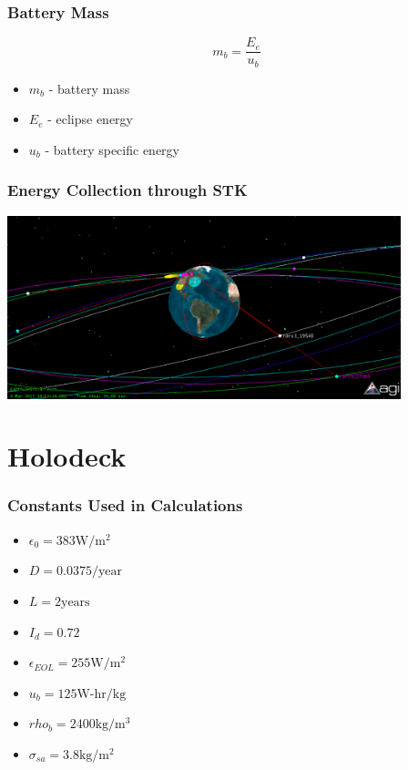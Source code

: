 \documentclass{beamer}
\begin{document}
\begin{frame}
  \frametitle{Battery Mass}
  \[m_b = \frac{E_e}{u_b}\]

  \begin{itemize}
  \item $m_b$ - battery mass
  \item $E_e$ - eclipse energy
  \item $u_b$ - battery specific energy
  \end{itemize}
\end{frame}

\begin{frame}
  \frametitle{Energy Collection through STK}
  \begin{center}
    \includegraphics[width=4.5in]{img/stk}
  \end{center}
\end{frame}

\section{Holodeck}
\begin{frame}
  \frametitle{Constants Used in Calculations}
  \begin{itemize}
  \item $\epsilon_0 = 383 \text{W}/\text{m}^2$
  \item $D = 0.0375/\text{year}$
  \item $L = 2 \text{years}$
  \item $I_d = 0.72$
  \item $\epsilon_{EOL} = 255 \text{W}/\text{m}^2$
  \item $u_b = 125 \text{W-hr}/\text{kg}$
  \item $rho_b = 2400 \text{kg}/\text{m}^3$
  \item $\sigma_{sa} = 3.8 \text{kg}/\text{m}^2$
  \end{itemize}
\end{frame}
\end{document}
